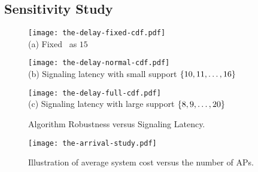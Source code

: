 \subsection{Sensitivity Study}
\label{subsec:advance}
\begin{figure*}[ht!]                                                                %
    \centering                                                                      %
    \begin{minipage}[b]{0.30\textwidth}                                             %
        \texttt{[image: the-delay-fixed-cdf.pdf]} \\              %
        {(a) Fixed \brlatency~as $15$}                                              %
        \\ %
    \end{minipage}                                                                  %
    \begin{minipage}[b]{0.30\textwidth}                                             %
        \texttt{[image: the-delay-normal-cdf.pdf]} \\             %
        {(b) Signaling latency with small support $\{10,11,\dots,16\}$}           %
    \end{minipage}                                                                  %
    \begin{minipage}[b]{0.30\textwidth}                                             %
        \texttt{[image: the-delay-full-cdf.pdf]} \\               %
        {(c) Signaling latency with large support $\{8,9,\dots,20\}$}             %
    \end{minipage}                                                                  %
    \caption{Algorithm Robustness versus Signaling Latency.}                        %
    \label{fig:ss_signal}                                                           %
\end{figure*}                                                                       %


\begin{figure}[hbt]                                                 %
    \centering                                                      %
    \texttt{[image: the-arrival-study.pdf]}   %
    \caption{Illustration of average system cost versus the number of APs.}
    \label{fig:ss_scale}                                            %
\end{figure}                                                        %

